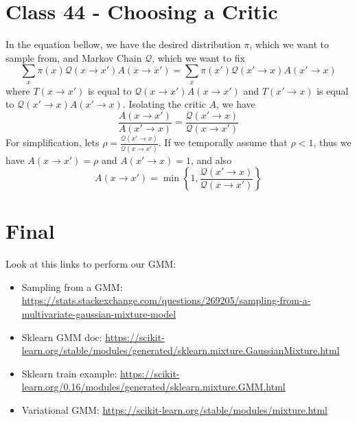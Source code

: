 \documentclass{article}
\begin{document}
\section{Class 44 - Choosing a Critic}
In the equation bellow, we have the desired distribution $\pi$, which we want to sample from, and Markov Chain $\mathcal{Q}$, which we want to fix
\begin{equation}
    \sum_x \pi(x)\mathcal{Q}(x \rightarrow x')A(x \rightarrow x') = \sum_x \pi(x')\mathcal{Q}(x' \rightarrow x)A(x' \rightarrow x) 
\end{equation}
where $T(x\rightarrow x')$ is equal to $\mathcal{Q}(x \rightarrow x')A(x \rightarrow x') $ and $T(x'\rightarrow x)$ is equal to $\mathcal{Q}(x' \rightarrow x)A(x' \rightarrow x)$. Isolating the critic $A$, we have
\begin{equation}
    \frac{A(x \rightarrow x')}{A(x' \rightarrow x)} = \frac{\mathcal{Q}(x' \rightarrow x)}{\mathcal{Q}(x \rightarrow x')}
\end{equation}
For simplification, lets $\rho = \frac{\mathcal{Q}(x' \rightarrow x)}{\mathcal{Q}(x \rightarrow x')}$. If we temporally assume that $\rho < 1$, thus we have $A(x \rightarrow x') = \rho$ and $A(x' \rightarrow x) = 1$, and also
\begin{equation}
    A(x \rightarrow x') = \min \left\{1, \frac{\mathcal{Q}(x' \rightarrow x)}{\mathcal{Q}(x \rightarrow x')} \right\}
\end{equation}

\section{Final}
Look at this links to perform our GMM:
\begin{itemize}
    \item Sampling from a GMM: \url{https://stats.stackexchange.com/questions/269205/sampling-from-a-multivariate-gaussian-mixture-model}
    \item Sklearn GMM doc: \url{https://scikit-learn.org/stable/modules/generated/sklearn.mixture.GaussianMixture.html}
    \item Sklearn train example: \url{https://scikit-learn.org/0.16/modules/generated/sklearn.mixture.GMM.html}
    \item Variational GMM: \url{https://scikit-learn.org/stable/modules/mixture.html}
\end{itemize}
\end{document}
